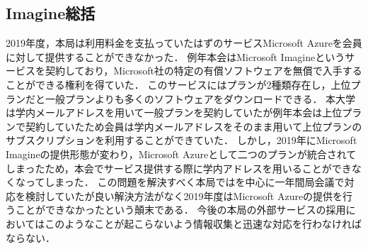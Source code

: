 \subsection*{Imagine総括}

2019年度，本局は利用料金を支払っていたはずのサービスMicrosoft Azureを会員に対して提供することができなかった．
例年本会はMicrosoft Imagineというサービスを契約しており，Microsoft社の特定の有償ソフトウェアを無償で入手することができる権利を得ていた．
このサービスにはプランが2種類存在し，上位プランだと一般プランよりも多くのソフトウェアをダウンロードできる．
本大学は学内メールアドレスを用いて一般プランを契約していたが例年本会は上位プランで契約していたため会員は学内メールアドレスをそのまま用いて上位プランのサブスクリプションを利用することができていた．
しかし，2019年にMicrosoft Imagineの提供形態が変わり，Microsoft Azureとして二つのプランが統合されてしまったため，本会でサービス提供する際に学内アドレスを用いることができなくなってしまった．
この問題を解決すべく本局では\thirdGrade{}を中心に一年間局会議で対応を検討していたが良い解決方法がなく2019年度はMicrosoft Azureの提供を行うことができなかったという顛末である．
今後の本局の外部サービスの採用においてはこのようなことが起こらないよう情報収集と迅速な対応を行わなければならない．